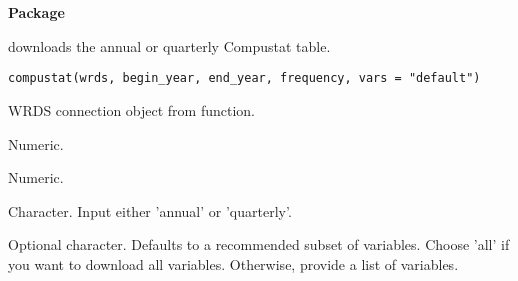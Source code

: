 \documentclass[a4paper]{book}
\begin{document}
\chapter*{}
\begin{center}
{\textbf{\huge Package}}
\par\bigskip{\large \today}
\end{center}
\begin{description}
\raggedright{}
\item[Type]
\item[Title]
\item[Version]
\item[Description]
\item[License]
\item[Encoding]
\item[LazyData]
\item[Imports]
\item[RoxygenNote]
\end{description}
%
\begin{Description}\relax
{} downloads the annual or quarterly Compustat table.
\end{Description}
%
\begin{Usage}
\begin{verbatim}
compustat(wrds, begin_year, end_year, frequency, vars = "default")
\end{verbatim}
\end{Usage}
%
\begin{Arguments}
\begin{ldescription}
\item[\code{wrds}] WRDS connection object from  function.

\item[\code{begin\_year}] Numeric.

\item[\code{end\_year}] Numeric.

\item[\code{frequency}] Character. Input either 'annual' or 'quarterly'.

\item[\code{vars}] Optional character. Defaults to a recommended subset of variables. Choose 'all' if
you want to download all variables. Otherwise, provide a list of variables.
\end{ldescription}
\end{Arguments}
\end{document}
